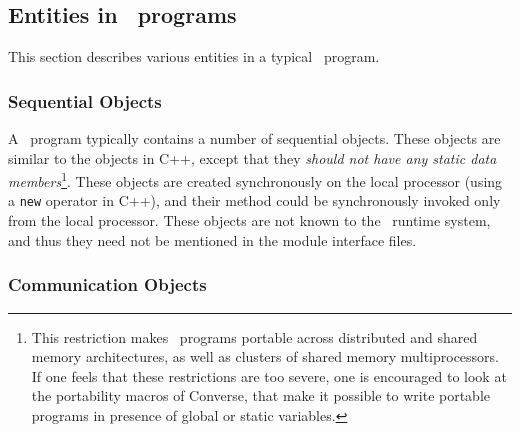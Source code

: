 

\subsection{Entities in \charmpp\ programs}

This section describes various entities in a typical \charmpp\ program.

\subsubsection{Sequential Objects}

A \charmpp\ program typically contains a number of sequential objects. These
objects are similar to the objects in C++, except that they {\em should 
not have any static data members}\footnote{
  This restriction makes \charmpp\ programs portable across distributed
  and shared memory architectures, as well as clusters of shared memory
  multiprocessors. If one feels that these restrictions are too severe,
  one is encouraged to look at the portability macros of Converse, that
  make it possible to write portable programs in presence of global or
  static variables.
}. These objects are created synchronously
on the local processor (using a {\tt new} operator in C++), and their
method could be synchronously invoked only from the local processor.
These objects are not known to the \charmpp\ runtime system, and
thus they need not be mentioned in the module interface files.

\subsubsection{Communication Objects}

